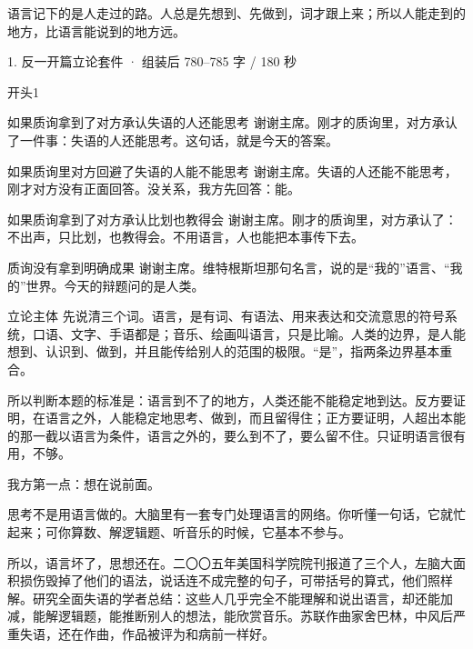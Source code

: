\documentclass[script,con]{debate}
\begin{document}
\debatetitle
\begin{thesisbox}[全场一句话立论]语言记下的是人走过的路。人总是先想到、先做到，词才跟上来；所以人能走到的地方，比语言能说到的地方远。\end{thesisbox}

\begin{kit}{1. 反一开篇立论}{套件 · 组装后 780–785 字 / 180 秒}
\begin{pick}{开头}{1}
\begin{module}{如果质询拿到了对方承认失语的人还能思考}
谢谢主席。刚才的质询里，对方承认了一件事：失语的人还能思考。这句话，就是今天的答案。
\end{module}
\begin{module}{如果质询里对方回避了失语的人能不能思考}
谢谢主席。失语的人还能不能思考，刚才对方没有正面回答。没关系，我方先回答：能。
\end{module}
\begin{module}{如果质询拿到了对方承认比划也教得会}
谢谢主席。刚才的质询里，对方承认了：不出声，只比划，也教得会。不用语言，人也能把本事传下去。
\end{module}
\begin{fallback}{质询没有拿到明确成果}
谢谢主席。维特根斯坦那句名言，说的是“我的”语言、“我的”世界。今天的辩题问的是人类。
\end{fallback}
\end{pick}
\begin{fixed}{立论主体}
先说清三个词。语言，是有词、有语法、用来表达和交流意思的符号系统，口语、文字、手语都是；音乐、绘画叫语言，只是比喻。人类的边界，是人能想到、认识到、做到，并且能传给别人的范围的极限。“是”，指两条边界基本重合。

所以判断本题的标准是：语言到不了的地方，人类还能不能稳定地到达。反方要证明，在语言之外，人能稳定地思考、做到，而且留得住；正方要证明，人超出本能的那一截以语言为条件，语言之外的，要么到不了，要么留不住。只证明语言很有用，不够。

我方第一点：想在说前面。

思考不是用语言做的。大脑里有一套专门处理语言的网络。你听懂一句话，它就忙起来；可你算数、解逻辑题、听音乐的时候，它基本不参与。

所以，语言坏了，思想还在。二〇〇五年美国科学院院刊报道了三个人，左脑大面积损伤毁掉了他们的语法，说话连不成完整的句子，可带括号的算式，他们照样解。研究全面失语的学者总结：这些人几乎完全不能理解和说出语言，却还能加减，能解逻辑题，能推断别人的想法，能欣赏音乐。苏联作曲家舍巴林，中风后严重失语，还在作曲，作品被评为和病前一样好。


\end{fixed}
\end{kit}
\end{document}
